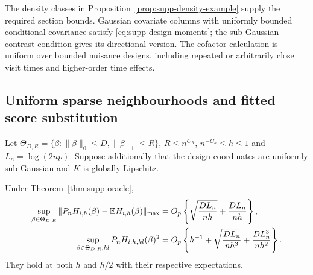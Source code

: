 The density classes in Proposition~\ref{prop:supp-density-example}
supply the required section bounds. Gaussian covariate columns with
uniformly bounded conditional covariance satisfy
\eqref{eq:supp-design-moments}; the sub-Gaussian contrast condition
gives its directional version. The cofactor calculation is uniform
over bounded nuisance designs, including repeated or arbitrarily
close visit times and higher-order time effects.

\subsection{Uniform sparse neighbourhoods and fitted score substitution}

Let $\Theta_{D,R}=\{\beta:\|\beta\|_0\leq D,\|\beta\|_1\leq R\}$,
$R\leq n^{C_R}$, $n^{-C_h}\leq h\leq1$ and $L_n=\log(2np)$.
Suppose additionally that the design coordinates are uniformly
sub-Gaussian and $K$ is globally Lipschitz.

\begin{theorem}\label{thm:supp-uniform}
Under Theorem~\ref{thm:supp-oracle},
\begin{align}
 \sup_{\beta\in\Theta_{D,R}}
 \|P_nH_{i,h}(\beta)-\mathbb{E} H_{i,h}(\beta)\|_{\max}
 &=O_p\left\{\sqrt{\frac{D L_n}{nh}}+\frac{D L_n}{nh}\right\},
 \label{eq:supp-uniform-H}\\
 \sup_{\beta\in\Theta_{D,R},kl}P_nH_{i,h,kl}(\beta)^2
 &=O_p\left\{h^{-1}+\sqrt{\frac{D L_n}{nh^3}}
                         +\frac{D L_n^3}{nh^2}\right\}.
 \label{eq:supp-uniform-H2}
\end{align}
They hold at both $h$ and $h/2$ with their respective expectations.
\end{theorem}

